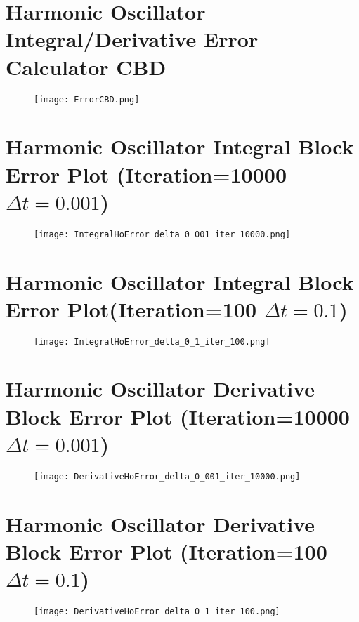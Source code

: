 \documentclass{article}
\begin{document}
\begin{appendices}
\section{Harmonic Oscillator Integral/Derivative \newline Error Calculator CBD}
\label{appendix:hoerror}
\begin{figure}[!ht]
  \centering
  \texttt{[image: ErrorCBD.png]}  
\end{figure}
\newpage
\section{Harmonic Oscillator Integral Block Error Plot (Iteration=10000 ${\Delta t } = 0.001$)}
\label{appendix:hointegralerror1}
\begin{figure}[!ht]
  \centering
  \texttt{[image: IntegralHoError\_delta\_0\_001\_iter\_10000.png]}  
\end{figure}

\section{Harmonic Oscillator Integral Block Error Plot(Iteration=100 ${\Delta t } = 0.1$)}
\label{appendix:hointegralerror2}
\begin{figure}[!ht]
  \centering
  \texttt{[image: IntegralHoError\_delta\_0\_1\_iter\_100.png]}  
\end{figure}

\newpage
\section{Harmonic Oscillator Derivative Block Error Plot (Iteration=10000 ${\Delta t } = 0.001$) }
\label{appendix:hoderivativeerror1}
\begin{figure}[!ht]
  \centering
  \texttt{[image: DerivativeHoError\_delta\_0\_001\_iter\_10000.png]}  
\end{figure}

\section{Harmonic Oscillator Derivative Block Error Plot (Iteration=100 ${\Delta t } = 0.1$)}
\label{appendix:hoderivativeerror2}
\begin{figure}[!ht]
  \centering
  \texttt{[image: DerivativeHoError\_delta\_0\_1\_iter\_100.png]}  
\end{figure}


\end{appendices}
\end{document}
